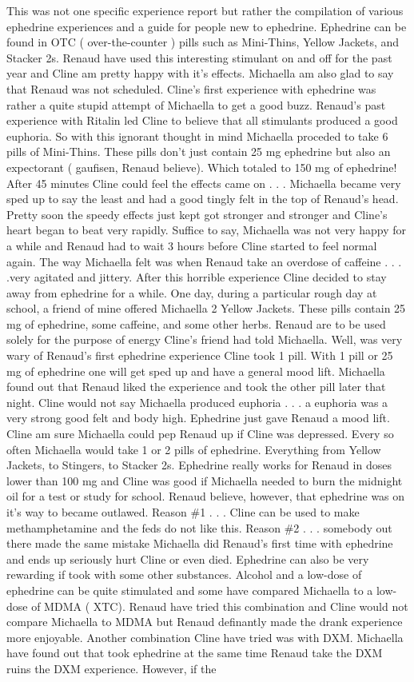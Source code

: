 \documentclass[12pt]{book}
\begin{document}
This was not one specific experience report but rather the compilation of various ephedrine experiences and a guide for people new to ephedrine. Ephedrine can be found in OTC ( over-the-counter ) pills such as Mini-Thins, Yellow Jackets, and Stacker 2s. Renaud have used this interesting stimulant on and off for the past year and Cline am pretty happy with it's effects. Michaella am also glad to say that Renaud was not scheduled. Cline's first experience with ephedrine was rather a quite stupid attempt of Michaella to get a good buzz. Renaud's past experience with Ritalin led Cline to believe that all stimulants produced a good euphoria. So with this ignorant thought in mind Michaella proceded to take 6 pills of Mini-Thins. These pills don't just contain 25 mg ephedrine but also an expectorant ( gaufisen, Renaud believe). Which totaled to 150 mg of ephedrine! After 45 minutes Cline could feel the effects came on . . .  Michaella became very sped up to say the least and had a good tingly felt in the top of Renaud's head. Pretty soon the speedy effects just kept got stronger and stronger and Cline's heart began to beat very rapidly. Suffice to say, Michaella was not very happy for a while and Renaud had to wait 3 hours before Cline started to feel normal again. The way Michaella felt was when Renaud take an overdose of caffeine . . .  .very agitated and jittery. After this horrible experience Cline decided to stay away from ephedrine for a while. One day, during a particular rough day at school, a friend of mine offered Michaella 2 Yellow Jackets. These pills contain 25 mg of ephedrine, some caffeine, and some other herbs. Renaud are to be used solely for the purpose of energy Cline's friend had told Michaella. Well, was very wary of Renaud's first ephedrine experience Cline took 1 pill. With 1 pill or 25 mg of ephedrine one will get sped up and have a general mood lift. Michaella found out that Renaud liked the experience and took the other pill later that night. Cline would not say Michaella produced euphoria . . .  a euphoria was a very strong good felt and body high. Ephedrine just gave Renaud a mood lift. Cline am sure Michaella could pep Renaud up if Cline was depressed. Every so often Michaella would take 1 or 2 pills of ephedrine. Everything from Yellow Jackets, to Stingers, to Stacker 2s. Ephedrine really works for Renaud in doses lower than 100 mg and Cline was good if Michaella needed to burn the midnight oil for a test or study for school. Renaud believe, however, that ephedrine was on it's way to became outlawed. Reason \#1 . . .  Cline can be used to make methamphetamine and the feds do not like this. Reason \#2 . . .  somebody out there made the same mistake Michaella did Renaud's first time with ephedrine and ends up seriously hurt Cline or even died. Ephedrine can also be very rewarding if took with some other substances. Alcohol and a low-dose of ephedrine can be quite stimulated and some have compared Michaella to a low-dose of MDMA ( XTC). Renaud have tried this combination and Cline would not compare Michaella to MDMA but Renaud definantly made the drank experience more enjoyable. Another combination Cline have tried was with DXM. Michaella have found out that took ephedrine at the same time Renaud take the DXM ruins the DXM experience. However, if the 
\end{document}
